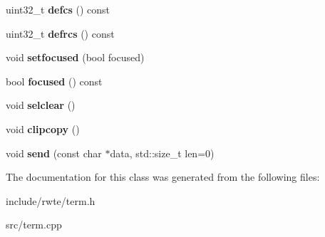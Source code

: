 \begin{DoxyCompactItemize}
uint32\+\_\+t {\bfseries defcs} () const
\item 
\mbox{\label{classterm_1_1Term_a55bbc07f9d4bde2fa1deda82196d7f48}} 
uint32\+\_\+t {\bfseries defrcs} () const
\item 
\mbox{\label{classterm_1_1Term_aa4a4d4083de5da92de662325a3d0f456}} 
void {\bfseries setfocused} (bool focused)
\item 
\mbox{\label{classterm_1_1Term_aca1a5f7fcb688e41180a0f4ab4bab6b9}} 
bool {\bfseries focused} () const
\item 
\mbox{\label{classterm_1_1Term_a5852e2d7a42f46b60974ed1923c70ac3}} 
void {\bfseries selclear} ()
\item 
\mbox{\label{classterm_1_1Term_a67b54e754de12cfa3c5305451191491e}} 
void {\bfseries clipcopy} ()
\item 
\mbox{\label{classterm_1_1Term_a9b006ad187b763579624bdc14c951675}} 
void {\bfseries send} (const char $\ast$data, std\+::size\+\_\+t len=0)
\end{DoxyCompactItemize}


The documentation for this class was generated from the following files\+:\begin{DoxyCompactItemize}
\item 
include/rwte/term.\+h\item 
src/term.\+cpp\end{DoxyCompactItemize}
